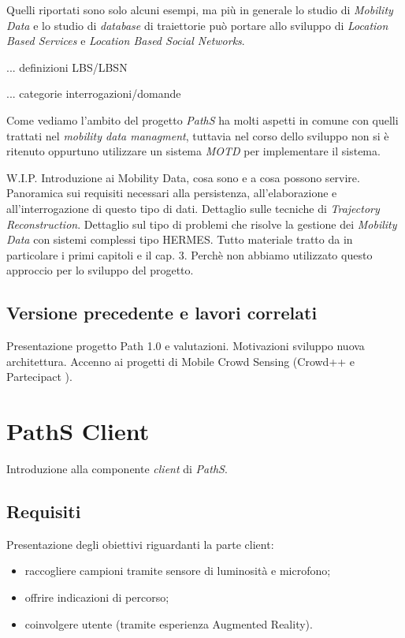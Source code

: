 \documentclass[a4paper, 12pt, twoside, openright]{book}
\begin{document}
Quelli riportati sono solo alcuni esempi, ma più in generale lo studio di \emph{Mobility Data} e lo studio di \emph{database} di traiettorie può portare allo sviluppo di \emph{Location Based Services} e \emph{Location Based Social Networks}. 

... definizioni LBS/LBSN

... categorie interrogazioni/domande

Come vediamo l'ambito del progetto \emph{PathS} ha molti aspetti in comune con quelli trattati nel \emph{mobility data managment}, tuttavia nel corso dello sviluppo non si è ritenuto oppurtuno utilizzare un sistema \emph{MOTD} per implementare il sistema.


W.I.P.
Introduzione ai Mobility Data, cosa sono e a cosa possono servire. Panoramica sui requisiti necessari alla persistenza, all'elaborazione e all'interrogazione di questo tipo di dati. Dettaglio sulle tecniche di \emph{Trajectory Reconstruction}. Dettaglio sul tipo di problemi che risolve la gestione dei \emph{Mobility Data} con sistemi complessi tipo HERMES. Tutto materiale tratto da \cite{mdme} in particolare i primi capitoli e il cap. 3.
Perchè non abbiamo utilizzato questo approccio per lo sviluppo del progetto. 

\section{Versione precedente e lavori correlati}
Presentazione progetto Path 1.0 e valutazioni. Motivazioni sviluppo nuova architettura. 
Accenno ai progetti di Mobile Crowd Sensing (Crowd++ \cite{crowdplusplus} e Partecipact \cite{participact}).

\chapter{PathS Client} %
\thispagestyle{empty}

Introduzione alla componente \emph{client} di \emph{PathS}. 

\section{Requisiti}
Presentazione degli obiettivi riguardanti la parte client:
\begin{itemize}
\item raccogliere campioni tramite sensore di luminosità e microfono;
\item offrire indicazioni di percorso;
\item coinvolgere utente (tramite esperienza Augmented Reality).
\end{itemize}
\end{document}
